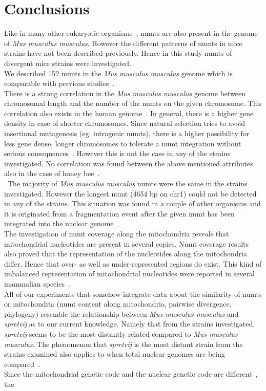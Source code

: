 \documentclass[a4paper,12pt]{article}
\numberwithin{equation}{section} %
\begin{document}
\section{Conclusions}
\indent Like in many other eukaryotic organisms~, numts are also present in the genome of  \textit{Mus musculus musculus}. However the different patterns of numts in mice strains have not been described previously. Hence in this study numts of  divergent mice strains were investigated.\\ \indent We described 152 numts in the \textit{Mus musculus musculus} genome which is comparable with previous studies~.\\ \indent There is a strong correlation in the \textit{Mus musculus musculus} genome between chromosomal length and the number of the numts on the given chromosome. This correlation also exists in the human genome~. In general, there is a higher gene density in case of shorter chromosomes. Since natural selection tries to avoid insertional mutagenesis (eg. intragenic numts), there is a higher possibility for less gene dense, longer chromosomes to tolerate a numt integration without serious consequences~. However this is not the case in any of the strains investigated. No correlation was found between the above mentioned attributes also in the case of honey bee~. \\ \indent The majority of \textit{Mus musculus musculus} numts were the same in the strains investigated. However the longest numt (4654 bp on chr1) could not be detected in any of the strains. This situation was found in a couple of other organisms and it is originated from a fragmentation event after the given numt has been integrated into the nuclear genome~.\\ \indent The investigation of numt coverage along the mitochondria reveals that mitochondrial nucleotides are present in several copies. Numt coverage results also proved that the representation of the nucleotides along the mitochondria differ. Hence that over- as well as under-represented regions do exist. This kind of imbalanced representation of mitochondrial nucleotides were reported in several mammalian species~.\\ \indent All of our experiments that somehow integrate data about the similarity of numts or mitochondria (numt content along mitochondria, pairwise divergence, phylogeny) resemble the relationship between \textit{Mus musculus musculus} and \textit{spreteij} as to our current knowledge. Namely that from the strains investigated, \textit{spreteij} seems to be the most distantly related compared to \textit{Mus musculus musculus}. The phenomenon that \textit{spreteij} is the most distant strain from the strains examined also applies to when total nuclear genomes are being compared~.\\ \indent Since the mitochondrial genetic code and the nuclear genetic code are different~, the 
\end{document}
